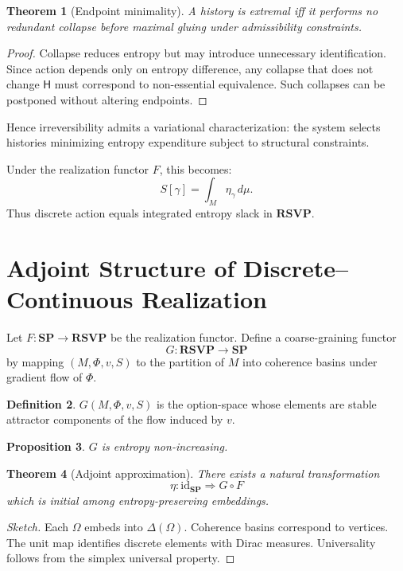 \documentclass[12pt,a4paper]{article}
\newtheorem{theorem}{Theorem}[section]
\newtheorem{proposition}[theorem]{Proposition}
\theoremstyle{definition}
\newtheorem{definition}[theorem]{Definition}
\theoremstyle{remark}
\newcommand{\Ent}{\ensuremath{\mathsf{H}}}
\newcommand{\SP}{\mathbf{SP}}
\newcommand{\RSVP}{\mathbf{RSVP}}
\providecommand{\id}{\mathrm{id}}
\renewcommand{\id}{\mathrm{id}}
\begin{document}
\begin{theorem}[Endpoint minimality]
A history is extremal iff it performs no redundant collapse before
maximal gluing under admissibility constraints.
\end{theorem}

\begin{proof}
Collapse reduces entropy but may introduce unnecessary identification.
Since action depends only on entropy difference, any collapse that does
not change $\Ent$ must correspond to non-essential equivalence.
Such collapses can be postponed without altering endpoints.
\end{proof}

Hence irreversibility admits a variational characterization: the system
selects histories minimizing entropy expenditure subject to structural
constraints.

Under the realization functor $F$, this becomes:
\[
  S[\gamma] = \int_{M} \eta_\gamma \, d\mu.
\]
Thus discrete action equals integrated entropy slack in $\RSVP$.

\section{Adjoint Structure of Discrete--Continuous Realization}
\label{sec:adjunction}

Let $F : \SP \to \RSVP$ be the realization functor.
Define a coarse-graining functor
\[
  G : \RSVP \to \SP
\]
by mapping $(M,\Phi,v,S)$ to the partition of $M$ into
coherence basins under gradient flow of $\Phi$.

\begin{definition}
$G(M,\Phi,v,S)$ is the option-space whose elements are
stable attractor components of the flow induced by $v$.
\end{definition}

\begin{proposition}
$G$ is entropy non-increasing.
\end{proposition}

\begin{theorem}[Adjoint approximation]
There exists a natural transformation
\[
  \eta : \id_{\SP} \Rightarrow G \circ F
\]
which is initial among entropy-preserving embeddings.
\end{theorem}

\begin{proof}[Sketch]
Each $\Omega$ embeds into $\Delta(\Omega)$.
Coherence basins correspond to vertices.
The unit map identifies discrete elements with Dirac measures.
Universality follows from the simplex universal property.
\end{proof}
\end{document}
